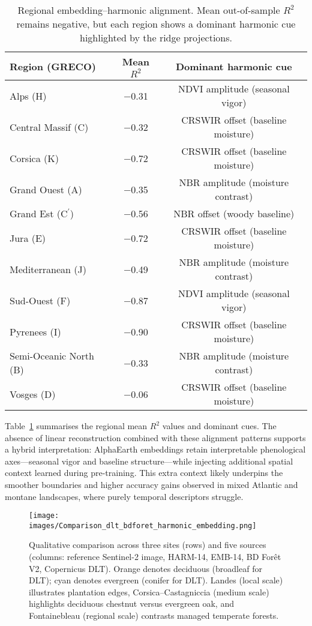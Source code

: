 \documentclass[utf8]{FrontiersinHarvard}
\begin{document}
\begin{table}[H]
    \centering
    \small
    \begin{tabular}{lcc}
        \toprule
        \textbf{Region (GRECO)} & \textbf{Mean $R^2$} & \textbf{Dominant harmonic cue} \\
        \midrule
        Alps (H) & −0.31 & NDVI amplitude (seasonal vigor) \\
        Central Massif (C) & −0.32 & CRSWIR offset (baseline moisture) \\
        Corsica (K) & −0.72 & CRSWIR offset (baseline moisture) \\
        Grand Ouest (A) & −0.35 & NBR amplitude (moisture contrast) \\
        Grand Est (C$^\prime$) & −0.56 & NBR offset (woody baseline) \\
        Jura (E) & −0.72 & CRSWIR offset (baseline moisture) \\
        Mediterranean (J) & −0.49 & NBR amplitude (moisture contrast) \\
        Sud-Ouest (F) & −0.87 & NDVI amplitude (seasonal vigor) \\
        Pyrenees (I) & −0.90 & CRSWIR offset (baseline moisture) \\
        Semi-Oceanic North (B) & −0.33 & NBR amplitude (moisture contrast) \\
        Vosges (D) & −0.06 & CRSWIR offset (baseline moisture) \\
        \bottomrule
    \end{tabular}
    \caption{Regional embedding–harmonic alignment. Mean out-of-sample \(R^2\) remains negative, but each region shows a dominant harmonic cue highlighted by the ridge projections.}
    \label{tab:similarity_summary}
\end{table}

Table~\ref{tab:similarity_summary} summarises the regional mean $R^2$ values and dominant cues. The absence of linear reconstruction combined with these alignment patterns supports a hybrid interpretation: AlphaEarth embeddings retain interpretable phenological axes—seasonal vigor and baseline structure—while injecting additional spatial context learned during pre-training. This extra context likely underpins the smoother boundaries and higher accuracy gains observed in mixed Atlantic and montane landscapes, where purely temporal descriptors struggle.

\begin{figure}[H]
    \centering
    \texttt{[image: images/Comparison\_dlt\_bdforet\_harmonic\_embedding.png]}
    \caption{Qualitative comparison across three sites (rows) and five sources (columns: reference Sentinel-2 image, HARM-14, EMB-14, BD Forêt V2, Copernicus DLT). Orange denotes deciduous (broadleaf for DLT); cyan denotes evergreen (conifer for DLT). Landes (local scale) illustrates plantation edges, Corsica--Castagniccia (medium scale) highlights deciduous chestnut versus evergreen oak, and Fontainebleau (regional scale) contrasts managed temperate forests.}
    \label{fig:comparison_products}
\end{figure}
\end{document}
